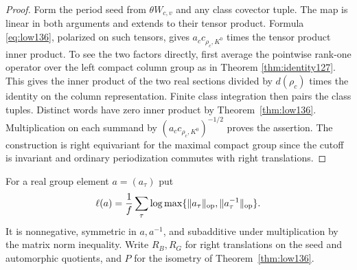 \documentclass[a4paper,11pt]{article}
\theoremstyle{definition}
\theoremstyle{remark}
\numberwithin{equation}{section}
\begin{document}
\begin{proof}
Form the period seed from \(\theta W_{c,v}\) and any class
covector tuple. The map is linear in both arguments and extends
to their tensor product. Formula \eqref{eq:low136}, polarized
on such tensors, gives \(a_c c_{\rho_c,K^0}\) times the tensor
product inner product. To see the two factors directly, first
average the pointwise rank-one operator over the left compact
column group as in Theorem \ref{thm:identity127}. This gives the
inner product of the two real sections divided by \(d(\rho_c)\)
times the identity on the column representation. Finite class
integration then pairs the class tuples. Distinct words have
zero inner product by Theorem~\ref{thm:low136}. Multiplication
on each summand by \((a_c c_{\rho_c,K^0})^{-1/2}\) proves the
assertion. The construction is right equivariant for the
maximal compact group since the cutoff is invariant and
ordinary periodization commutes with right translations.
\end{proof}

For a real group element \(a=(a_\tau)\) put
\[
 \ell(a)=\frac1f\sum_\tau\log
       \max\{\|a_\tau\|_{\rm op},\|a_\tau^{-1}\|_{\rm op}\}.
\]
It is nonnegative, symmetric in \(a,a^{-1}\), and subadditive
under multiplication by the matrix norm inequality. Write
\(R_B,R_G\) for right translations on the seed and automorphic
quotients, and \(P\) for the isometry of Theorem~\ref{thm:low136}.
\end{document}
